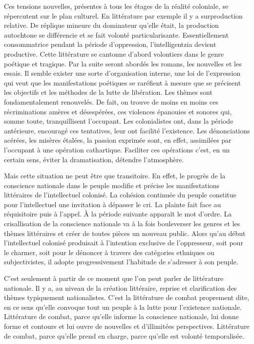 \documentclass[french,twoside]{book} %
\begin{document}
\noindent Ces tensions nouvelles, présentes à tous les étages de la réalité coloniale, se répercutent sur le plan culturel. En littérature par exemple il y a surproduction relative. De réplique mineure du dominateur qu’elle était, la production autochtone se différencie et se fait volonté particularisante. Essentiellement consommatrice pendant la période d’oppression, l’intelligentzia devient productive. Cette littérature se cantonne d’abord volontiers dans le genre poétique et tragique. Par la suite seront abordés les   romans, les nouvelles et les essais. Il semble exister une sorte d’organisation interne, une loi de l’expression qui veut que les manifestations poétiques se raréfient à mesure que se précisent les objectifs et les méthodes de la lutte de libération. Les thèmes sont fondamentalement renouvelés. De fait, on trouve de moins en moins ces récriminations amères et désespérées, ces violences épanouies et sonores qui, somme toute, tranquillisent l’occupant. Les colonialistes ont, dans la période antérieure, encouragé ces tentatives, leur ont facilité l’existence. Les dénonciations acérées, les misères étalées, la passion exprimée sont, en effet, assimilées par l’occupant à une opération cathartique. Faciliter ces opérations c’est, en un certain sens, éviter la dramatisation, détendre l’atmosphère.\par
Mais cette situation ne peut être que transitoire. En effet, le progrès de la conscience nationale dans le peuple modifie et précise les manifestations littéraires de l’intellectuel colonisé. La cohésion continuée du peuple constitue pour l’intellectuel une invitation à dépasser le cri. La plainte fait face au réquisitoire puis à l’appel. À la période suivante apparaît le mot d’ordre. La crisallisation de la conscience nationale va à la fois bouleverser les genres et les thèmes littéraires et créer de toutes pièces un nouveau public. Alors qu’au début l’intellectuel colonisé produisait à l’intention exclusive de l’oppresseur, soit pour le charmer, soit pour le dénoncer à travers des catégories ethniques ou subjectivistes, il adopte progressivement l’habitude de s’adresser à son peuple.\par
\bigbreak
\noindent C’est seulement à partir de ce moment que l’on peut parler de littérature nationale. Il y a, au niveau de la création littéraire, reprise et clarification des thèmes typiquement nationalistes. C’est la littérature de combat proprement dite, en ce sens qu’elle convoque tout un peuple à la lutte pour l’existence nationale. Littérature de combat, parce qu’elle informe la conscience nationale, lui donne forme et contours et lui ouvre de nouvelles et d’illimitées perspectives. Littérature de combat, parce qu’elle prend en charge, parce qu’elle est volonté temporalisée.\par
\end{document}
